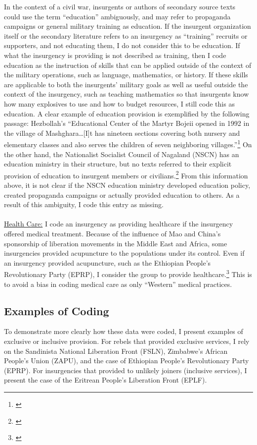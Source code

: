 \documentclass[12pt, letterpaper]{article}
\begin{document}
In the context of a civil war, insurgents or authors of secondary source texts could use the term ``education'' ambiguously, and may refer to propaganda campaigns or general military training as education. If the insurgent organization itself or the secondary literature refers to an insurgency as ``training'' recruits or supporters, and not educating them, I do not consider this to be education. If what the insurgency is providing is not described as training, then I code education as the instruction of skills that can be applied outside of the context of the military operations, such as language, mathematics, or history. If these skills are applicable to both the insurgents' military goals as well as useful outside the context of the insurgency, such as teaching mathematics so that insurgents know how many explosives to use and how to budget resources, I still code this as education. A clear example of education provision is exemplified by the following passage: Hezbollah's ``Educational Center of the Martyr Bojeii opened in 1992 in the village of Mashghara\ldots [I]t has nineteen sections covering both nursery and elementary classes and also serves the children of seven neighboring villages.''\footnote{\citealt[164]{jaber1997hezbollah}} On the other hand, the Nationalist Socialist Council of Nagaland (NSCN) has an education ministry in their structure, but no texts referred to their explicit provision of education to insurgent members or civilians.\footnote{\citealt{satp2014}} From this information above, it is not clear if the NSCN education ministry developed education policy, created propaganda campaigns or actually provided education to others. As a result of this ambiguity, I code this entry as missing. 
\\
\\
\noindent \underline{Health Care:}
I code an insurgency as providing healthcare if the insurgency offered medical treatment. Because of the influence of Mao and China's sponsorship of liberation movements in the Middle East and Africa, some insurgencies provided acupuncture to the populations under its control. Even if an insurgency provided acupuncture, such as the Ethiopian People's Revolutionary Party (EPRP), I consider the group to provide healthcare.\footnote{\citealt[368-9]{tadesse1998generation}} This is to avoid a bias in coding medical care as only ``Western'' medical practices. 


\subsection*{Examples of Coding}
To demonstrate more clearly how these data were coded, I present examples of exclusive or inclusive provision. For rebels that provided exclusive services, I rely on the Sandinista National Liberation Front (FSLN), Zimbabwe's African People's Union (ZAPU), and the case of Ethiopian People's Revolutionary Party (EPRP). For insurgencies that provided to unlikely joiners (inclusive services), I present the case of the Eritrean People's Liberation Front (EPLF).
\end{document}
